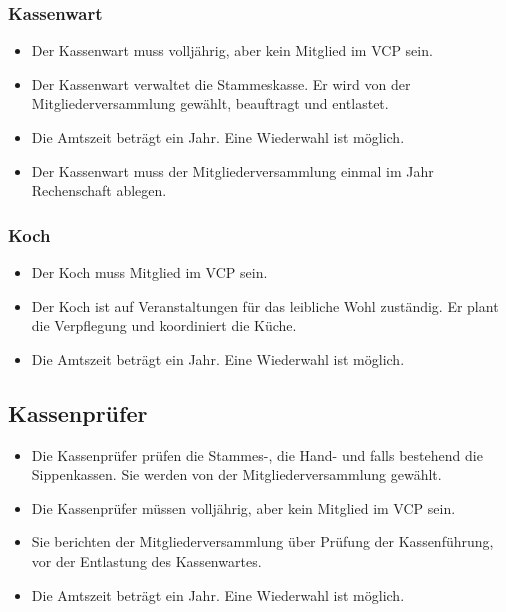 \documentclass[a4paper]{article}
\begin{document}
    \subsubsection{Kassenwart} %
    \label{ssub:kassenwart}
	\begin{itemize}
		\item Der Kassenwart muss volljährig, aber kein Mitglied im VCP sein. 
		\item Der Kassenwart verwaltet die Stammeskasse. Er wird von der Mitgliederversammlung gewählt, beauftragt und entlastet. 
		\item Die Amtszeit beträgt ein Jahr. Eine Wiederwahl ist möglich. 
		\item Der Kassenwart muss der Mitgliederversammlung einmal im Jahr Rechenschaft ablegen. 
	\end{itemize}
    
    \subsubsection{Koch} %
    \label{ssub:koch}
	\begin{itemize}
		\item Der Koch muss Mitglied im VCP sein. 
		\item Der Koch ist auf Veranstaltungen für das leibliche Wohl zuständig. Er plant die Verpflegung und koordiniert die Küche. 
		\item Die Amtszeit beträgt ein Jahr. Eine Wiederwahl ist möglich. 
	\end{itemize}
    
    
    \subsection{Kassenprüfer} %
    \label{sub:kassenprufer}
	\begin{itemize}
		\item Die Kassenprüfer prüfen die Stammes-, die Hand- und falls bestehend die Sippenkassen. Sie werden von der Mitgliederversammlung gewählt. 
		\item Die Kassenprüfer müssen volljährig, aber kein Mitglied im VCP sein. 
		\item Sie berichten der Mitgliederversammlung über Prüfung der Kassenführung, vor der Entlastung des Kassenwartes. 
		\item Die Amtszeit beträgt ein Jahr. Eine Wiederwahl ist möglich. 
	\end{itemize}
\end{document}
